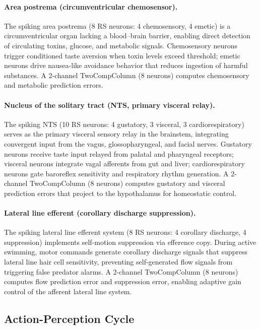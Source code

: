 \documentclass[11pt,a4paper]{article}
\begin{document}
\paragraph{Area postrema (circumventricular chemosensor).}
The spiking area postrema (8 RS neurons: 4 chemosensory, 4 emetic)
is a circumventricular organ lacking a blood--brain barrier, enabling
direct detection of circulating toxins, glucose, and metabolic signals.
Chemosensory neurons trigger conditioned taste aversion when toxin
levels exceed threshold; emetic neurons drive nausea-like avoidance
behavior that reduces ingestion of harmful substances.
A 2-channel TwoCompColumn (8 neurons) computes chemosensory and
metabolic prediction errors.

\paragraph{Nucleus of the solitary tract (NTS, primary visceral relay).}
The spiking NTS (10 RS neurons: 4 gustatory, 3 visceral,
3 cardiorespiratory) serves as the primary visceral sensory relay
in the brainstem, integrating convergent input from the vagus,
glossopharyngeal, and facial nerves.
Gustatory neurons receive taste input relayed from palatal and
pharyngeal receptors; visceral neurons integrate vagal afferents
from gut and liver; cardiorespiratory neurons gate baroreflex
sensitivity and respiratory rhythm generation.
A 2-channel TwoCompColumn (8 neurons) computes gustatory and visceral
prediction errors that project to the hypothalamus for homeostatic control.

\paragraph{Lateral line efferent (corollary discharge suppression).}
The spiking lateral line efferent system (8 RS neurons: 4 corollary
discharge, 4 suppression) implements self-motion suppression via
efference copy.
During active swimming, motor commands generate corollary discharge
signals that suppress lateral line hair cell sensitivity, preventing
self-generated flow signals from triggering false predator alarms.
A 2-channel TwoCompColumn (8 neurons) computes flow prediction error
and suppression error, enabling adaptive gain control of the afferent
lateral line system.

\subsection{Action-Perception Cycle}
\end{document}
